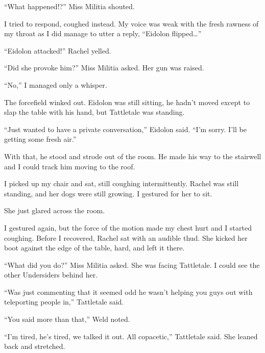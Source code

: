 ``What happened!?'' Miss Militia shouted.



I tried to respond, coughed instead.  My voice was weak with the fresh rawness of my throat as I did manage to utter a reply, ``Eidolon flipped\ldots''



``Eidolon attacked!'' Rachel yelled.



``Did she provoke him?''  Miss Militia asked.  Her gun was raised.



``No,'' I managed only a whisper.



The forcefield winked out.  Eidolon was still sitting, he hadn't moved except to slap the table with his hand, but Tattletale was standing.



``Just wanted to have a private conversation,'' Eidolon said.  ``I'm sorry.  I'll be getting some fresh air.''



With that, he stood and strode out of the room.  He made his way to the stairwell and I could track him moving to the roof.



I picked up my chair and sat, still coughing intermittently.  Rachel was still standing, and her dogs were still growing.  I gestured for her to sit.



She just glared across the room.



I gestured again, but the force of the motion made my chest hurt and I started coughing.  Before I recovered, Rachel sat with an audible thud.  She kicked her boot against the edge of the table, hard, and left it there.



``What did you do?'' Miss Militia asked.  She was facing Tattletale.  I could see the other Undersiders behind her.



``Was just commenting that it seemed odd he wasn't helping you guys out with teleporting people in,'' Tattletale said.



``You said more than that,'' Weld noted.



``I'm tired, he's tired, we talked it out.  All copacetic,'' Tattletale said.  She leaned back and stretched.



